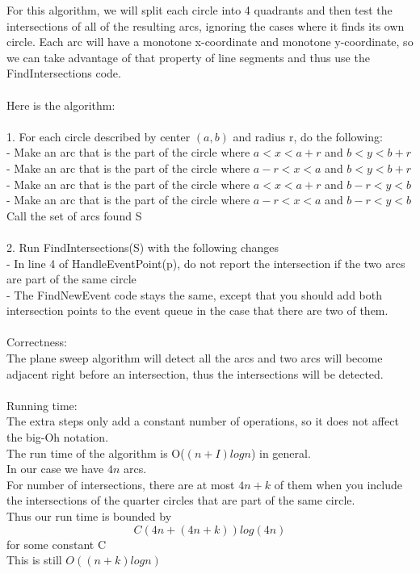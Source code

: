 \documentclass[11pt,psfig]{article}
\begin{document}
For this algorithm, we will split each circle into 4 quadrants and then test the intersections of all of the resulting arcs, ignoring the cases where it finds its own circle. Each arc will have a monotone x-coordinate and monotone y-coordinate, so we can take advantage of that property of line segments and thus use the FindIntersections code. \\
\\
Here is the algorithm:\\
\\
1. For each circle described by center $(a,b)$ and radius r, do the following:\\
- Make an arc that is the part of the circle where $a < x < a+r$ and $b < y < b+r$\\
- Make an arc that is the part of the circle where $a-r < x < a$ and $b < y < b+r$\\
- Make an arc that is the part of the circle where $a < x < a+r$ and $b-r < y < b$\\
- Make an arc that is the part of the circle where $a-r < x < a$ and $b-r < y < b$\\
Call the set of arcs found S\\
\\
2. Run FindIntersections(S) with the following changes\\
- In line 4 of HandleEventPoint(p), do not report the intersection if the two arcs are part of the same circle\\
- The FindNewEvent code stays the same, except that you should add both intersection points to the event queue in the case that there are two of them. \\
\\
Correctness:\\
The plane sweep algorithm will detect all the arcs and two arcs will become adjacent right before an intersection, thus the intersections will be detected. \\
\\
Running time:\\
The extra steps only add a constant number of operations, so it does not affect the big-Oh notation. \\
The run time of the algorithm is O($(n+I)logn$) in general.\\
In our case we have $4n$ arcs. \\
For number of intersections, there are at most $4n + k$ of them when you include the intersections of the quarter circles that are part of the same circle. \\
Thus our run time is bounded by 
\[
C(4n + (4n+k) )log(4n)
\]
for some constant C\\
This is still $O((n+k)logn)$
\end{document}
